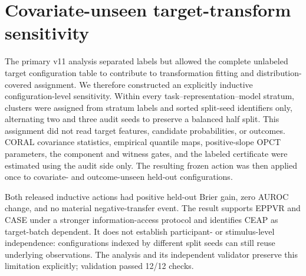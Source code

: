 \documentclass[preprint,12pt]{elsarticle}
\begin{document}
\section{Covariate-unseen target-transform sensitivity}

The primary v11 analysis separated labels but allowed the complete unlabeled target configuration table to contribute to transformation fitting and distribution-covered assignment. We therefore constructed an explicitly inductive configuration-level sensitivity. Within every task--representation--model stratum, clusters were assigned from stratum labels and sorted split-seed identifiers only, alternating two and three audit seeds to preserve a balanced half split. This assignment did not read target features, candidate probabilities, or outcomes. CORAL covariance statistics, empirical quantile maps, positive-slope OPCT parameters, the component and witness gates, and the labeled certificate were estimated using the audit side only. The resulting frozen action was then applied once to covariate- and outcome-unseen held-out configurations.

\begin{table}[!htbp]
\centering
\caption{Configuration-level inductive sensitivity. The transductive gain is the archived v11 outcome-held-out result. Identity actions have zero gain by construction and are non-interventions, not successful calibration.}
\label{tab:inductive-target}
\small
\setlength{\tabcolsep}{4pt}
\end{table}

Both released inductive actions had positive held-out Brier gain, zero AUROC change, and no material negative-transfer event. The result supports EPPVR and CASE under a stronger information-access protocol and identifies CEAP as target-batch dependent. It does not establish participant- or stimulus-level independence: configurations indexed by different split seeds can still reuse underlying observations. The analysis and its independent validator preserve this limitation explicitly; validation passed 12/12 checks.
\end{document}
